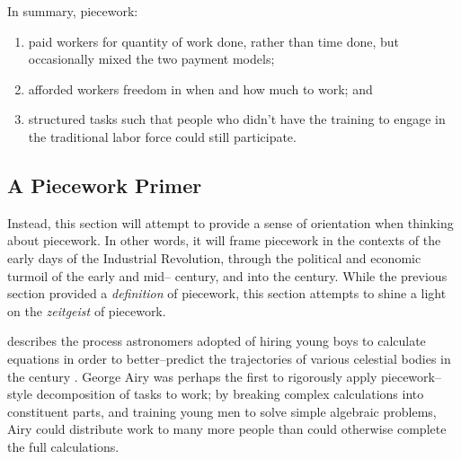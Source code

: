 \documentclass[trackingWork]{subfiles}
\begin{document}
In summary, piecework:
\begin{enumerate}
  \item paid workers for quantity of work done, rather than time done,
        but occasionally mixed the two payment models;
  \item afforded workers freedom in when and how much to work; and
  \item structured tasks such that people who didn't have the training
        to engage in the traditional labor force could still participate.
\end{enumerate}







\subsection{A Piecework Primer}\label{sec:pieceworkPrimer} %
Instead, this section will attempt to provide a sense of orientation when thinking about piecework.
In other words, it will frame piecework in the contexts of
the early days of the Industrial Revolution,
through the political and economic turmoil of the early and mid-- century,
and into the  century.
While the previous section provided a \textit{definition} of piecework,
this section attempts to shine a light on the \textit{zeitgeist} of piecework.


\citeauthor{grier2013computers} describes the process astronomers adopted of hiring young boys
to calculate equations in order
to better--predict the trajectories of various celestial bodies in the  century
\cite{grier2013computers}.
George Airy was perhaps the first to rigorously apply piecework--style decomposition of tasks to work;
by breaking complex calculations into constituent parts, and
training young men to solve simple algebraic problems,
Airy could distribute work to many more people than could otherwise complete the full calculations.
\end{document}
